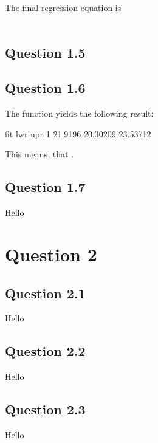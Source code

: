 \documentclass[parskip=full]{scrartcl}
\begin{document}
    The final regression equation is \\
    \\

    \subsection*{Question 1.5}


    \subsection*{Question 1.6}

    The  function yields the following result:
    
    \begin{lcverbatim}
      fit      lwr      upr
1 21.9196 20.30209 23.53712
    \end{lcverbatim}
    
    This means, that .

    \subsection*{Question 1.7}
    
    Hello
\section*{Question 2}
    \subsection*{Question 2.1}
    Hello
    \subsection*{Question 2.2}
    Hello
    \subsection*{Question 2.3}
    Hello
\end{document}
